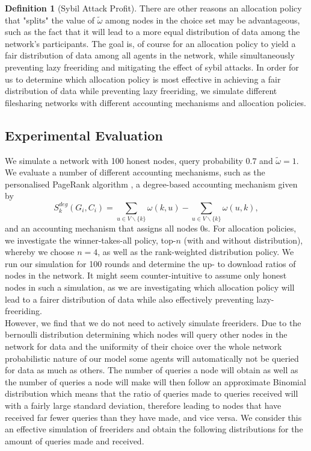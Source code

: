 \documentclass[11pt,a4paper]{article}
\theoremstyle{definition}
\newtheorem{definition}{Definition}[section]
\theoremstyle{theorem}
\theoremstyle{proposition}
\theoremstyle{corollary}
\theoremstyle{lemma}
\theoremstyle{example}
\theoremstyle{remark}
\begin{document}
\begin{definition}[Sybil Attack Profit]
\noindent{}There are other reasons an allocation policy that "splits" the value of $\tilde{\omega}$ among nodes in the choice set may be advantageous, such as the fact that it will lead to a more equal distribution of data among the network's participants. The goal is, of course for an allocation policy to yield a fair distribution of data among all agents in the network, while simultaneously preventing lazy freeriding and mitigating the effect of sybil attacks. In order for us to determine which allocation policy is most effective in achieving a fair distribution of data while preventing lazy freeriding, we simulate different filesharing networks with different accounting mechanisms and allocation policies.\vspace{1em}\\

\subsection{Experimental Evaluation}
\label{subsec:Experimental Evaluation}
\noindent{}We simulate a network with 100 honest nodes, query probability $0.7$ and $\tilde{\omega}=1$. We evaluate a number of different accounting mechanisms, such as the personalised PageRank algorithm \cite{A Random Walk Based Trust Ranking in Distributed Systems}, a degree-based accounting mechanism given by 
\[
S^{deg}_k(G_i,C_i)=\sum\limits_{u\in{}V\backslash\{k\}}\omega(k,u) - \sum\limits_{u\in{}V\backslash\{k\}}\omega(u,k),
\]
\noindent{}and an accounting mechanism that assigns all nodes $0$s. For allocation policies, we investigate the winner-takes-all policy, top-$n$ (with and without distribution), whereby we choose $n=4$, as well as the rank-weighted distribution policy. We run our simulation for 100 rounds and determine the up- to download ratios of nodes in the network. It might seem counter-intuitive to assume only honest nodes in such a simulation, as we are investigating which allocation policy will lead to a fairer distribution of data while also effectively preventing lazy-freeriding. \vspace{1em}\\

\noindent{}However, we find that we do not need to actively simulate freeriders. Due to the bernoulli distribution determining which nodes will query other nodes in the network for data and the uniformity of their choice over the whole network probabilistic nature of our model some agents will automatically not be queried for data as much as others. The number of queries a node will obtain as well as the number of queries a node will make will then follow an approximate Binomial distribution which means that the ratio of queries made to queries received will with a fairly large standard deviation, therefore leading to nodes that have received far fewer queries than they have made, and vice versa. We consider this an effective simulation of freeriders and obtain the following distributions for the amount of queries made and received. \vspace{1em}\\


\end{definition}
\end{document}
